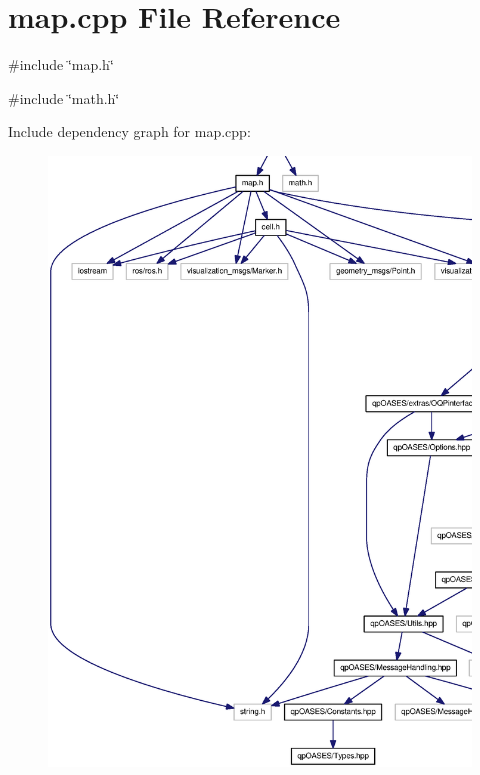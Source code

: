 \section{map.cpp File Reference}
\label{map_8cpp}
{\ttfamily \#include \char`\"{}map.h\char`\"{}}\par
{\ttfamily \#include \char`\"{}math.h\char`\"{}}\par
Include dependency graph for map.cpp:
\nopagebreak
\begin{figure}[H]
\begin{center}
\leavevmode
\includegraphics[width=400pt]{map_8cpp__incl}
\end{center}
\end{figure}
